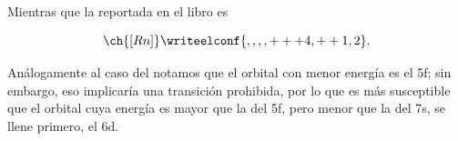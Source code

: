 \documentclass[./../main.tex]{subfiles}
\begin{document}
\begin{exercise}
\begin{solution}
\begin{enumerate}
                Mientras que la reportada en el libro es

                \begin{equation*}
                    \ch{[Rn]}\writeelconf{,,,,+++4,++1,2}.
                \end{equation*}

                Análogamente al caso del  notamos que el orbital con menor energía es el 5f; sin embargo, eso implicaría una transición prohibida, por lo que es más susceptible que el orbital cuya energía es mayor que la del 5f, pero menor que la del 7s, se llene primero, \idest el 6d.
            \end{enumerate}        
        \end{solution}
    \end{exercise}
\end{document}
